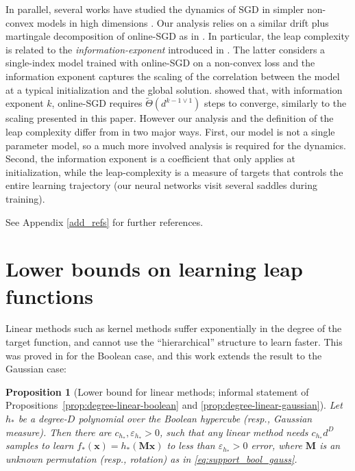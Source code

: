 \documentclass[11pt]{article}
\newcommand{\eps}{\varepsilon}
\newcommand{\<}{\langle}
\renewcommand{\>}{\rangle}
\newtheorem{proposition}{Proposition}
\theoremstyle{definition}
\def\bM{{\boldsymbol M}}
\def\bx{{\boldsymbol x}}
\def\bx{{\boldsymbol x}}
\def\eps{\varepsilon}
\begin{document}
 In parallel, several works have studied the dynamics of SGD in simpler non-convex models in high dimensions \citep{ge2015escaping,tan2019online,chen2019gradient,arous2021online}. Our analysis relies on a similar drift plus martingale decomposition of online-SGD as in \cite{tan2019online,arous2021online}. In particular, the leap complexity is related to the \textit{information-exponent} introduced in \cite{arous2021online}. The latter considers a single-index model trained with online-SGD on a non-convex loss and the information exponent captures the scaling of the correlation between the model at a typical initialization and the global solution. \cite{arous2021online} showed that, with information exponent $k$, online-SGD requires $\widetilde{\Theta} (d^{k-1 \vee 1})$ steps to converge, similarly to the scaling presented in this paper. However our analysis and the definition of the leap complexity differ from \cite{arous2021online} in two major ways. First, our model is not a single parameter model, so a much more involved analysis is required for the dynamics. Second, the information exponent is a coefficient that only applies at initialization, while the leap-complexity is a measure of targets that controls the entire learning trajectory (our neural networks visit several saddles during training). 
 
 See Appendix \ref{add_refs} for further references. 















\section{Lower bounds on learning leap functions}\label{csq}

Linear methods such as kernel methods suffer exponentially in the degree of the target function, and cannot use the ``hierarchical'' structure to learn faster. This was proved in \cite{abbe2022merged} for the Boolean case, and this work extends the result to the Gaussian case:

\begin{proposition}[Lower bound for linear methods; informal statement of Propositions~\ref{prop:degree-linear-boolean} and \ref{prop:degree-linear-gaussian}]\label{prop:informal-linear-lower-bound}
Let $h_*$ be a degree-$D$ polynomial over the Boolean hypercube (resp., Gaussian measure). Then there are $c_{h_*}, \eps_{h_*} > 0$, such that any linear method needs $c_{h_*} d^D$ samples to learn $f_*(\bx) = h_*(\bM \bx)$ to less than $\eps_{h_*} > 0$ error, where $\bM$ is an unknown permutation (resp., rotation) as in \eqref{eq:support_bool_gauss}.
\end{proposition}
\end{document}
